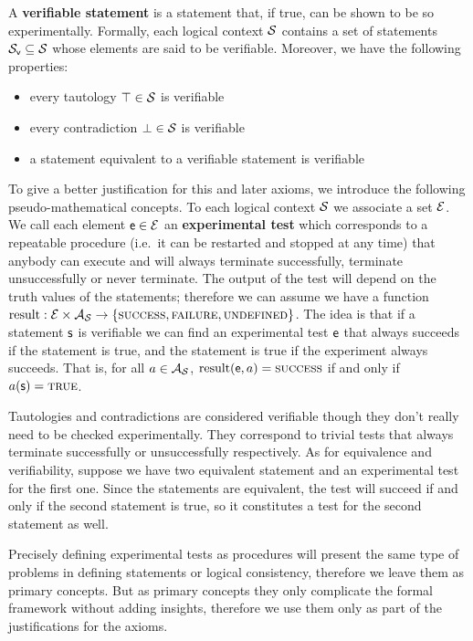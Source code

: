 \documentclass[11pt,letterpaper,fleqn]{memoir} %
\begin{document}
\begin{mathSection}
\begin{axiom}\label{ax_verifiable_statements}
	A \textbf{verifiable statement} is a statement that, if true, can be shown to be so experimentally. Formally, each logical context $\mathcal{S}$ contains a set of statements $\mathcal{S}_\textsf{v} \subseteq \mathcal{S}$ whose elements are said to be verifiable. Moreover, we have the following properties:
	\begin{itemize}
		\item every tautology $\top \in \mathcal{S}$ is verifiable
		\item every contradiction $\bot \in \mathcal{S}$ is verifiable
		\item a statement equivalent to a verifiable statement is verifiable
	\end{itemize}
\end{axiom}
\begin{justification}
	To give a better justification for this and later axioms, we introduce the following pseudo-mathematical concepts. To each logical context $\mathcal{S}$ we associate a set $\mathcal{E}$. We call each element $\mathsf{e} \in \mathcal{E}$ an \textbf{experimental test} which corresponds to a repeatable procedure (i.e.~it can be restarted and stopped at any time) that anybody can execute and will always terminate successfully, terminate unsuccessfully or never terminate. The output of the test will depend on the truth values of the statements; therefore we can assume we have a function $\operatorname{result}: \mathcal{E} \times \mathcal{A}_{\mathcal{S}} \to \{\textsc{success}, \textsc{failure}, \textsc{undefined}\}$. The idea is that if a statement $\mathsf{s}$ is verifiable we can find an experimental test $\mathsf{e}$ that always succeeds if the statement is true, and the statement is true if the experiment always succeeds. That is, for all $a \in \mathcal{A}_{\mathcal{S}}$, $\operatorname{result}(\mathsf{e}, a) = \textsc{success}$ if and only if $a(\mathsf{s}) = \textsc{true}$.
	
	Tautologies and contradictions are considered verifiable though they don't really need to be checked experimentally. They correspond to trivial tests that always terminate successfully or unsuccessfully respectively. As for equivalence and verifiability, suppose we have two equivalent statement and an experimental test for the first one. Since the statements are equivalent, the test will succeed if and only if the second statement is true, so it constitutes a test for the second statement as well.
	
	Precisely defining experimental tests as procedures will present the same type of problems in defining statements or logical consistency, therefore we leave them as primary concepts. But as primary concepts they only complicate the formal framework without adding insights, therefore we use them only as part of the justifications for the axioms.
\end{justification}
\end{mathSection}
\end{document}
